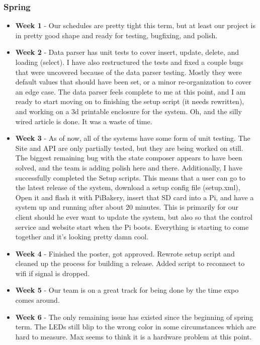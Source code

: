 \documentclass[onecolumn, draftclsnofoot,10pt, compsoc]{IEEEtran}
\begin{document}
			\subsubsection{Spring}
				\begin{itemize}
					\item \textbf{Week 1} - Our schedules are pretty tight this term, but at least our project is in pretty good shape and ready for testing, bugfixing, and polish.
					\item \textbf{Week 2} - Data parser has unit tests to cover insert, update, delete, and loading (select). I have also restructured the tests and fixed a couple bugs that were uncovered because of the data parser testing. Mostly they were default values that should have been set, or a minor re-organization to cover an edge case. The data parser feels complete to me at this point, and I am ready to start moving on to finishing the setup script (it needs rewritten), and working on a 3d printable enclosure for the system. Oh, and the silly wired article is done. It was a waste of time.
					\item \textbf{Week 3} - As of now, all of the systems have some form of unit testing. The Site and API are only partially tested, but they are being worked on still. The biggest remaining bug with the state composer appears to have been solved, and the team is adding polish here and there. Additionally, I have successfully completed the Setup scripts. This means that a user can go to the latest release of the system, download a setup config file (setup.xml), Open it and flash it with PiBakery, insert that SD card into a Pi, and have a system up and running after about 20 minutes. This is primarily for our client should he ever want to update the system, but also so that the control service and website start when the Pi boots. Everything is starting to come together and it's looking pretty damn cool.
					\item \textbf{Week 4} - Finished the poster, got approved. Rewrote setup script and cleaned up the process for building a release. Added script to reconnect to wifi if signal is dropped.
					\item \textbf{Week 5} - Our team is on a great track for being done by the time expo comes around.
					\item \textbf{Week 6} - The only remaining issue has existed since the beginning of spring term. The LEDs still blip to the wrong color in some circumstances which are hard to measure. Max seems to think it is a hardware problem at this point.

\end{itemize}
\end{document}
